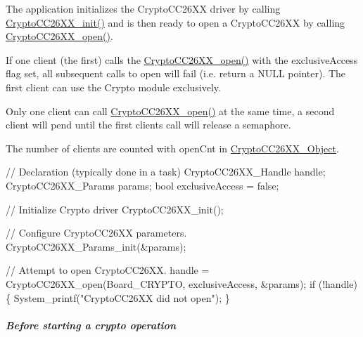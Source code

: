 \begin{DoxyItemize}
\item The application initializes the Crypto\+C\+C26\+X\+X driver by calling \hyperlink{_crypto_c_c26_x_x_8h_a512b301a6ebf10a41c86d9ff725f7749}{Crypto\+C\+C26\+X\+X\+\_\+init()} and is then ready to open a Crypto\+C\+C26\+X\+X by calling \hyperlink{_crypto_c_c26_x_x_8h_a21aa1458d0b063ee3637a40487e8ee12}{Crypto\+C\+C26\+X\+X\+\_\+open()}.
\item If one client (the first) calls the \hyperlink{_crypto_c_c26_x_x_8h_a21aa1458d0b063ee3637a40487e8ee12}{Crypto\+C\+C26\+X\+X\+\_\+open()} with the exclusive\+Access flag set, all subsequent calls to open will fail (i.\+e. return a N\+U\+L\+L pointer). The first client can use the Crypto module exclusively.
\item Only one client can call \hyperlink{_crypto_c_c26_x_x_8h_a21aa1458d0b063ee3637a40487e8ee12}{Crypto\+C\+C26\+X\+X\+\_\+open()} at the same time, a second client will pend until the first client\textquotesingle{}s call will release a semaphore.
\item The number of clients are counted with open\+Cnt in \hyperlink{struct_crypto_c_c26_x_x___object}{Crypto\+C\+C26\+X\+X\+\_\+\+Object}.
\end{DoxyItemize}
\begin{DoxyCode}
\textcolor{comment}{// Declaration (typically done in a task)}
CryptoCC26XX_Handle      handle;
CryptoCC26XX_Params      params;
\textcolor{keywordtype}{bool}                     exclusiveAccess = \textcolor{keyword}{false};

\textcolor{comment}{// Initialize Crypto driver}
CryptoCC26XX_init();

\textcolor{comment}{// Configure CryptoCC26XX parameters.}
CryptoCC26XX_Params_init(&params);

\textcolor{comment}{// Attempt to open CryptoCC26XX.}
handle = CryptoCC26XX_open(Board\_CRYPTO, exclusiveAccess, &params);
\textcolor{keywordflow}{if} (!handle) \{
    System\_printf(\textcolor{stringliteral}{"CryptoCC26XX did not open"});
\}
\end{DoxyCode}


\subparagraph*{Before starting a crypto operation}



